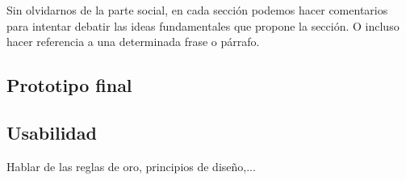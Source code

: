 Sin olvidarnos de la parte social, en cada sección podemos hacer comentarios para intentar debatir las ideas fundamentales que propone la sección. O incluso hacer referencia a una determinada frase o párrafo.

\subsection{Prototipo final}

\subsection{Usabilidad}

Hablar de las reglas de oro, principios de diseño,...

